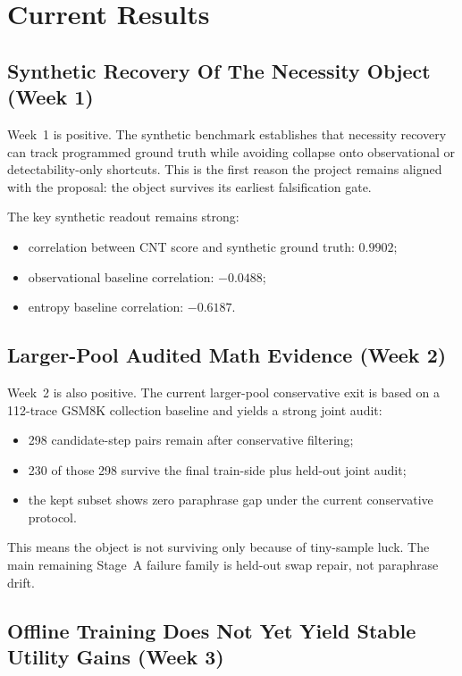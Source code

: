 \section{Current Results}

\subsection{Synthetic Recovery Of The Necessity Object (Week 1)}

Week~1 is positive. The synthetic benchmark establishes that necessity recovery can track programmed ground truth while avoiding collapse onto observational or detectability-only shortcuts. This is the first reason the project remains aligned with the proposal: the object survives its earliest falsification gate.

The key synthetic readout remains strong:

\begin{itemize}
  \item correlation between CNT score and synthetic ground truth: $0.9902$;
  \item observational baseline correlation: $-0.0488$;
  \item entropy baseline correlation: $-0.6187$.
\end{itemize}

\subsection{Larger-Pool Audited Math Evidence (Week 2)}

Week~2 is also positive. The current larger-pool conservative exit is based on a 112-trace GSM8K collection baseline and yields a strong joint audit:

\begin{itemize}
  \item 298 candidate-step pairs remain after conservative filtering;
  \item 230 of those 298 survive the final train-side plus held-out joint audit;
  \item the kept subset shows zero paraphrase gap under the current conservative protocol.
\end{itemize}

This means the object is not surviving only because of tiny-sample luck. The main remaining Stage~A failure family is held-out swap repair, not paraphrase drift.

\subsection{Offline Training Does Not Yet Yield Stable Utility Gains (Week 3)}

